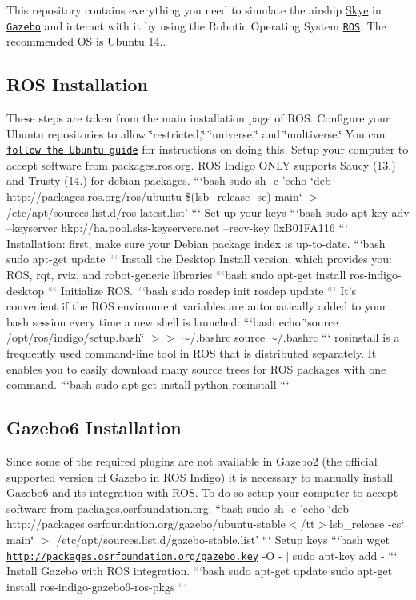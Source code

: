 This repository contains everything you need to simulate the airship \hyperlink{class_skye}{Skye} in \href{http://gazebosim.org/}{\tt Gazebo} and interact with it by using the Robotic Operating System \href{http://www.ros.org/}{\tt R\-O\-S}. The recommended O\-S is Ubuntu 14..

\subsection*{R\-O\-S Installation}

These steps are taken from the main installation page of R\-O\-S. Configure your Ubuntu repositories to allow \char`\"{}restricted,\char`\"{} \char`\"{}universe,\char`\"{} and \char`\"{}multiverse.\char`\"{} You can \href{https://help.ubuntu.com/community/Repositories/Ubuntu}{\tt follow the Ubuntu guide} for instructions on doing this. Setup your computer to accept software from packages.\-ros.\-org. R\-O\-S Indigo O\-N\-L\-Y supports Saucy (13.) and Trusty (14.) for debian packages. ```bash sudo sh -\/c 'echo \char`\"{}deb http\-://packages.\-ros.\-org/ros/ubuntu \$(lsb\-\_\-release -\/sc) main\char`\"{} $>$ /etc/apt/sources.list.\-d/ros-\/latest.list' ``` Set up your keys ```bash sudo apt-\/key adv --keyserver hkp\-://ha.pool.\-sks-\/keyservers.\-net --recv-\/key 0x\-B01\-F\-A116 ``` Installation\-: first, make sure your Debian package index is up-\/to-\/date. ```bash sudo apt-\/get update ``` Install the Desktop Install version, which provides you\-: R\-O\-S, rqt, rviz, and robot-\/generic libraries ```bash sudo apt-\/get install ros-\/indigo-\/desktop ``` Initialize R\-O\-S. ```bash sudo rosdep init rosdep update ``` It's convenient if the R\-O\-S environment variables are automatically added to your bash session every time a new shell is launched\-: ```bash echo \char`\"{}source /opt/ros/indigo/setup.\-bash\char`\"{} $>$$>$ $\sim$/.bashrc source $\sim$/.bashrc ``` rosinstall is a frequently used command-\/line tool in R\-O\-S that is distributed separately. It enables you to easily download many source trees for R\-O\-S packages with one command. ```bash sudo apt-\/get install python-\/rosinstall ``` \subsection*{Gazebo6 Installation}

Since some of the required plugins are not available in Gazebo2 (the official supported version of Gazebo in R\-O\-S Indigo) it is necessary to manually install Gazebo6 and its integration with R\-O\-S. To do so setup your computer to accept software from packages.\-osrfoundation.\-org. ``{\ttfamily bash sudo sh -\/c 'echo \char`\"{}deb http\-://packages.\-osrfoundation.\-org/gazebo/ubuntu-\/stable$<$/tt$>$lsb\-\_\-release -\/cs` main\char`\"{} $>$ /etc/apt/sources.list.\-d/gazebo-\/stable.list' ``` Setup keys ```bash wget \href{http://packages.osrfoundation.org/gazebo.key}{\tt http\-://packages.\-osrfoundation.\-org/gazebo.\-key} -\/\-O -\/ $\vert$ sudo apt-\/key add -\/ ``` Install Gazebo with R\-O\-S integration. ```bash sudo apt-\/get update sudo apt-\/get install ros-\/indigo-\/gazebo6-\/ros-\/pkgs ```}

